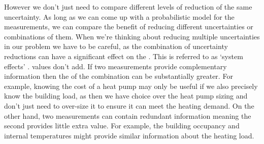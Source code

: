 However we don't just need to compare different levels of reduction of the same uncertainty. As long as we can come up with a probabilistic model for the measurements, we can compare the benefit of reducing different uncertainties or combinations of them. When we're thinking about reducing multiple uncertainties in our problem we have to be careful, as the combination of uncertainty reductions can have a significant effect on the . This is referred to as `system effects' \citep{difrancesco2023SystemEffectsIdentifying}.  values don't add. If two measurements provide complementary information then the  of the combination can be substantially greater. For example, knowing the cost of a heat pump may only be useful if we also precisely know the building load, as then we have choice over the heat pump sizing and don't just need to over-size it to ensure it can meet the heating demand. On the other hand, two measurements can contain redundant information meaning the second provides little extra value. For example, the building occupancy and internal temperatures might provide similar information about the heating load.\\

